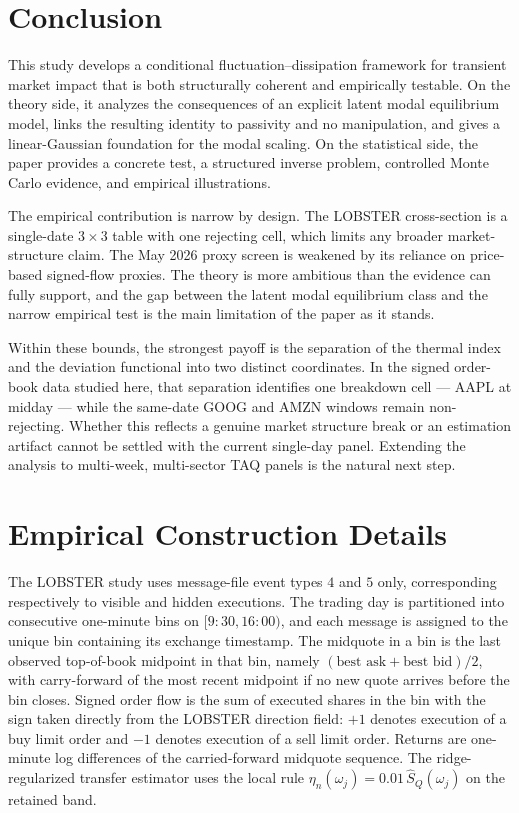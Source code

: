 \documentclass[11pt]{article}
\newcommand{\REV}{}
\begin{document}
\section{Conclusion}
\REV
This study develops a conditional fluctuation--dissipation framework for transient market impact that is both structurally coherent and empirically testable. On the theory side, it analyzes the consequences of an explicit latent modal equilibrium model, links the resulting identity to passivity and no manipulation, and gives a linear-Gaussian foundation for the modal scaling. On the statistical side, the paper provides a concrete test, a structured inverse problem, controlled Monte Carlo evidence, and empirical illustrations.

The empirical contribution is narrow by design. The LOBSTER cross-section is a single-date $3\times3$ table with one rejecting cell, which limits any broader market-structure claim. The May 2026 proxy screen is weakened by its reliance on price-based signed-flow proxies. The theory is more ambitious than the evidence can fully support, and the gap between the latent modal equilibrium class and the narrow empirical test is the main limitation of the paper as it stands.

Within these bounds, the strongest payoff is the separation of the thermal index and the deviation functional into two distinct coordinates. In the signed order-book data studied here, that separation identifies one breakdown cell --- AAPL at midday --- while the same-date GOOG and AMZN windows remain non-rejecting. Whether this reflects a genuine market structure break or an estimation artifact cannot be settled with the current single-day panel. Extending the analysis to multi-week, multi-sector TAQ panels is the natural next step.

\appendix

\section{Empirical Construction Details}
\REV
The LOBSTER study uses message-file event types $4$ and $5$ only, corresponding respectively to visible and hidden executions. The trading day is partitioned into consecutive one-minute bins on $[9{:}30,16{:}00)$, and each message is assigned to the unique bin containing its exchange timestamp. The midquote in a bin is the last observed top-of-book midpoint in that bin, namely $(\text{best ask}+\text{best bid})/2$, with carry-forward of the most recent midpoint if no new quote arrives before the bin closes. Signed order flow is the sum of executed shares in the bin with the sign taken directly from the LOBSTER direction field: $+1$ denotes execution of a buy limit order and $-1$ denotes execution of a sell limit order. Returns are one-minute log differences of the carried-forward midquote sequence. The ridge-regularized transfer estimator uses the local rule $\eta_n(\omega_j)=0.01\,\widehat S_Q(\omega_j)$ on the retained band.
\end{document}
